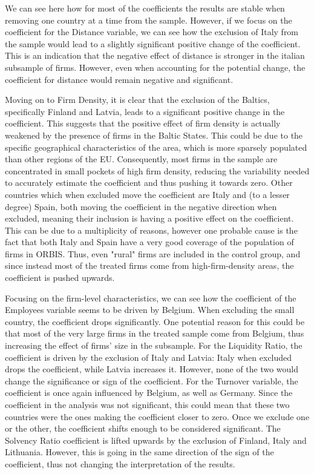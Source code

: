 \documentclass[12pt]{report}
\begin{document}
\par We can see here how for most of the coefficients the results are stable when removing one country at a time from the sample. However, if we focus on the coefficient for the Distance variable, we can see how the exclusion of Italy from the sample would lead to a slightly significant positive change of the coefficient. This is an indication that the negative effect of distance is stronger in the italian subsample of firms. However, even when accounting for the potential change, the coefficient for distance would remain negative and significant.

\par Moving on to Firm Density, it is clear that the exclusion of the Baltics, specifically Finland and Latvia, leads to a significant positive change in the coefficient. This suggests that the positive effect of firm density is actually weakened by the presence of firms in the Baltic States. This could be due to the specific geographical characteristics of the area, which is more sparsely populated than other regions of the EU. Consequently, most firms in the sample are concentrated in small pockets of high firm density, reducing the variability needed to accurately estimate the coefficient and thus pushing it towards zero. Other countries which when excluded move the coefficient are Italy and (to a lesser degree) Spain, both moving the coefficient in the negative direction when excluded, meaning their inclusion is having a positive effect on the coefficient. This can be due to a multiplicity of reasons, however one probable cause is the fact that both Italy and Spain have a very good coverage of the population of firms in ORBIS. Thus, even "rural" firms are included in the control group, and since instead most of the treated firms come from high-firm-density areas, the coefficient is pushed upwards.

\par Focusing on the firm-level characteristics, we can see how the coefficient of the Employees variable seems to be driven by Belgium. When excluding the small country, the coefficient drops significantly. One potential reason for this could be that most of the very large firms in the treated sample come from Belgium, thus increasing the effect of firms' size in the subsample. For the Liquidity Ratio, the coefficient is driven by the exclusion of Italy and Latvia: Italy when excluded drops the coefficient, while Latvia increases it. However, none of the two would change the significance or sign of the coefficient. For the Turnover variable, the coefficient is once again influenced by Belgium, as well as Germany. Since the coefficient in the analysis was not significant, this could mean that these two countries were the ones making the coefficient closer to zero. Once we exclude one or the other, the coefficient shifts enough to be considered significant. The Solvency Ratio coefficient is lifted upwards by the exclusion of Finland, Italy and Lithuania. However, this is going in the same direction of the sign of the coefficient, thus not changing the interpretation of the results.
\end{document}
